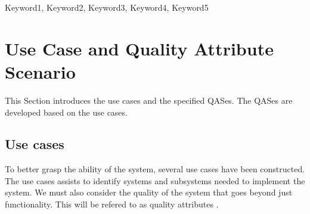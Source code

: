 \documentclass[conference]{IEEEtran}
\begin{document}
\maketitle
\IEEEpubidadjcol
\begin{abstract}





\end{abstract}

\begin{IEEEkeywords}
    Keyword1, Keyword2, Keyword3, Keyword4, Keyword5
\end{IEEEkeywords}



\vspace{1cm}



\vspace{1cm}



\section{Use Case and Quality Attribute Scenario}
\label{sec:use_case_and_qas}
This Section introduces the use cases and the specified QASes.
The QASes are developed based on the use cases.



\subsection{Use cases}
\label{sec:use_case}
To better grasp the ability of the system, several use cases have been constructed. The use cases assists to identify systems and subsystems needed to implement the system.
We must also consider the quality of the system that goes beyond just functionality. This will be refered to as quality attributes \cite{bass2021software}.
\end{document}
